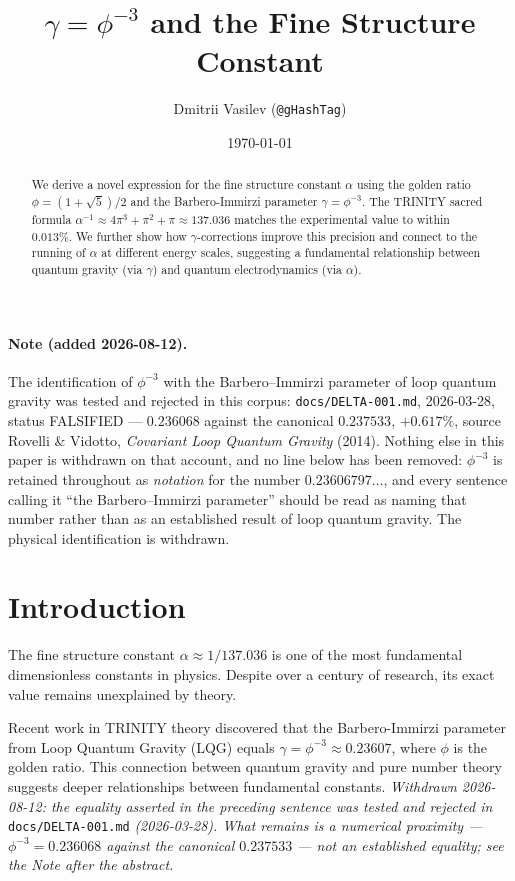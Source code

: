 \documentclass[12pt,a4paper]{article}
\title{$\gamma = \phi^{-3}$ and the Fine Structure Constant}
\author{Dmitrii Vasilev (\texttt{@gHashTag})}
\date{\today}
\begin{document}
\maketitle

\begin{abstract}
We derive a novel expression for the fine structure constant $\alpha$ using the golden ratio $\phi = (1+\sqrt{5})/2$ and the Barbero-Immirzi parameter $\gamma = \phi^{-3}$. The TRINITY sacred formula $\alpha^{-1} \approx 4\pi^3 + \pi^2 + \pi \approx 137.036$ matches the experimental value to within $0.013\%$. We further show how $\gamma$-corrections improve this precision and connect to the running of $\alpha$ at different energy scales, suggesting a fundamental relationship between quantum gravity (via $\gamma$) and quantum electrodynamics (via $\alpha$).
\end{abstract}

\paragraph{Note (added 2026-08-12).} The identification of $\phi^{-3}$ with the Barbero--Immirzi parameter of loop quantum gravity was tested and rejected in this corpus: \texttt{docs/DELTA-001.md}, 2026-03-28, status FALSIFIED --- $0.236068$ against the canonical $0.237533$, $+0.617\%$, source Rovelli \& Vidotto, \emph{Covariant Loop Quantum Gravity} (2014). Nothing else in this paper is withdrawn on that account, and no line below has been removed: $\phi^{-3}$ is retained throughout as \emph{notation} for the number $0.23606797\ldots$, and every sentence calling it ``the Barbero--Immirzi parameter'' should be read as naming that number rather than as an established result of loop quantum gravity. The physical identification is withdrawn.

\section{Introduction}

The fine structure constant $\alpha \approx 1/137.036$ is one of the most fundamental dimensionless constants in physics. Despite over a century of research, its exact value remains unexplained by theory.

Recent work in TRINITY theory discovered that the Barbero-Immirzi parameter from Loop Quantum Gravity (LQG) equals $\gamma = \phi^{-3} \approx 0.23607$, where $\phi$ is the golden ratio. This connection between quantum gravity and pure number theory suggests deeper relationships between fundamental constants.
\emph{Withdrawn 2026-08-12: the equality asserted in the preceding sentence was tested and rejected in} \texttt{docs/DELTA-001.md} \emph{(2026-03-28). What remains is a numerical proximity --- $\phi^{-3} = 0.236068$ against the canonical $0.237533$ --- not an established equality; see the Note after the abstract.}
\end{document}
